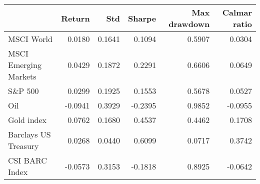 \begin{tabular}{lrrrrr}
\toprule
{} &  Return &     Std &  Sharpe &  Max drawdown &  Calmar ratio \\
\midrule
MSCI World            &  0.0180 &  0.1641 &  0.1094 &        0.5907 &        0.0304 \\
MSCI Emerging Markets &  0.0429 &  0.1872 &  0.2291 &        0.6606 &        0.0649 \\
S\&P 500               &  0.0299 &  0.1925 &  0.1553 &        0.5678 &        0.0527 \\
Oil                   & -0.0941 &  0.3929 & -0.2395 &        0.9852 &       -0.0955 \\
Gold index            &  0.0762 &  0.1680 &  0.4537 &        0.4462 &        0.1708 \\
Barclays US Treasury  &  0.0268 &  0.0440 &  0.6099 &        0.0717 &        0.3742 \\
CSI BARC Index        & -0.0573 &  0.3153 & -0.1818 &        0.8925 &       -0.0642 \\
\bottomrule
\end{tabular}
